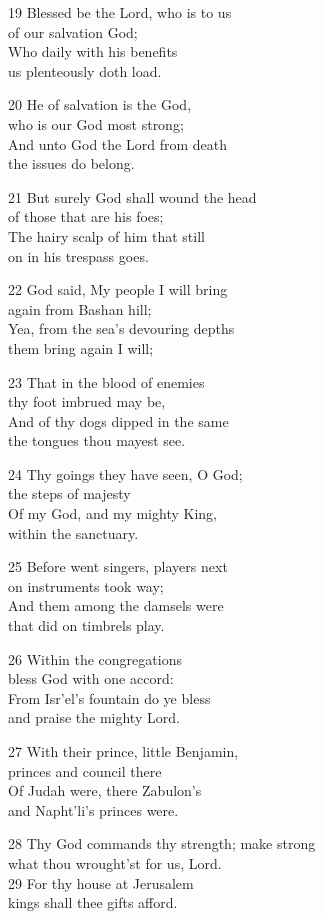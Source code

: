 \begin{multicols}{3}
19 Blessed be the Lord, who is to us\\
of our salvation God;\\
Who daily with his benefits\\
us plenteously doth load.

20 He of salvation is the God,\\
who is our God most strong;\\
And unto God the Lord from death\\
the issues do belong.

21 But surely God shall wound the head\\
of those that are his foes;\\
The hairy scalp of him that still\\
on in his trespass goes.

22 God said, My people I will bring\\
again from Bashan hill;\\
Yea, from the sea’s devouring depths\\
them bring again I will;

23 That in the blood of enemies\\
thy foot imbrued may be,\\
And of thy dogs dipped in the same\\
the tongues thou mayest see.

24 Thy goings they have seen, O God;\\
the steps of majesty\\
Of my God, and my mighty King,\\
within the sanctuary.

25 Before went singers, players next\\
on instruments took way;\\
And them among the damsels were\\
that did on timbrels play.

26 Within the congregations\\
bless God with one accord:\\
From Isr’el’s fountain do ye bless\\
and praise the mighty Lord.

27 With their prince, little Benjamin,\\
princes and council there\\
Of Judah were, there Zabulon’s\\
and Napht’li’s princes were.

28 Thy God commands thy strength; make strong\\
what thou wrought’st for us, Lord.\\
29 For thy house at Jerusalem\\
kings shall thee gifts afford.


\end{multicols}
